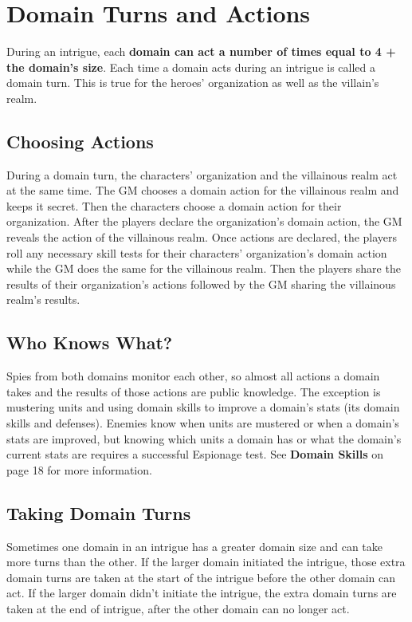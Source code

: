 \documentclass[10pt,a4paper,twoside,bg=print,twocolumn,openany,nodeprecatedcode]{dndbook}
\begin{document}
\section{Domain Turns and Actions}
During an intrigue, each \textbf{domain can act a number of times equal to 4 + the domain's size}. Each time a domain acts during an intrigue is called a domain turn. This is true for the heroes' organization as well as the villain's realm.

\subsection{Choosing Actions}
During a domain turn, the characters' organization and the villainous realm act at the same time. The GM chooses a domain action for the villainous realm and keeps it secret. Then the characters choose a domain action for their organization. After the players declare the organization's domain action, the GM reveals the action of the villainous realm. Once actions are declared, the players roll any necessary skill tests for their characters' organization's domain action while the GM does the same for the villainous realm. Then the players share the results of their organization's actions followed by the GM sharing the villainous realm's results.

\subsection{Who Knows What?}
Spies from both domains monitor each other, so almost all actions a domain takes and the results of those actions are public knowledge. The exception is mustering units and using domain skills to improve a domain's stats (its domain skills and defenses). Enemies know when units are mustered or when a domain's stats are improved, but knowing which units a domain has or what the domain's current stats are requires a successful Espionage test. See \textbf{Domain Skills} on page 18 for more information.

\subsection{Taking Domain Turns}
Sometimes one domain in an intrigue has a greater domain size and can take more turns than the other. If the larger domain initiated the intrigue, those extra domain turns are taken at the start of the intrigue before the other domain can act. If the larger domain didn't initiate the intrigue, the extra domain turns are taken at the end of intrigue, after the other domain can no longer act.
\end{document}
